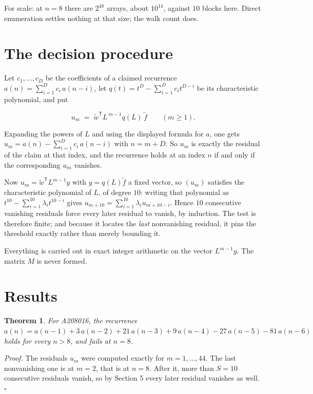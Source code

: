 \documentclass[11pt]{article}
\newtheorem{theorem}{Theorem}
\theoremstyle{definition}
\begin{document}
For scale: at $n = 8$ there are $2^{48}$ arrays, about $10^{14}$, against $10$ blocks here. Direct enumeration settles nothing at that size; the walk count does.

\section{The decision procedure}

Let $c_1,\dots,c_D$ be the coefficients of a claimed recurrence $a(n) = \sum_{i=1}^{D} c_i\,a(n-i)$, let $q(t) = t^{D} - \sum_{i=1}^{D} c_i t^{D-i}$ be its characteristic polynomial, and put

\[u_m \;=\; \tilde w^{\mathsf T} L^{\,m-1} q(L)\,\tilde f \qquad (m \ge 1).\]

Expanding the powers of $L$ and using the displayed formula for $a$, one gets $u_m = a(n) - \sum_{i=1}^{D} c_i\,a(n-i)$ with $n = m + D$. So $u_m$ is exactly the residual of the claim at that index, and the recurrence holds at an index $n$ if and only if the corresponding $u_m$ vanishes.

Now $u_m = \tilde w^{\mathsf T} L^{m-1} y$ with $y = q(L)\tilde f$ a fixed vector, so $(u_m)$ satisfies the characteristic polynomial of $L$, of degree $10$: writing that polynomial as $t^{10} - \sum_{i=1}^{10} \lambda_i t^{10-i}$ gives $u_{m+10} = \sum_{i=1}^{10} \lambda_i u_{m+10-i}$. Hence $10$ consecutive vanishing residuals force every later residual to vanish, by induction. The test is therefore finite; and because it locates the {\itshape last} nonvanishing residual, it pins the threshold exactly rather than merely bounding it.

Everything is carried out in exact integer arithmetic on the vector $L^{m-1}y$. The matrix $M$ is never formed.

\section{Results}

\begin{theorem} For A208016, the recurrence $a(n) = a(n-1) + 3\,a(n-2) + 21\,a(n-3) + 9\,a(n-4) - 27\,a(n-5) - 81\,a(n-6)$ holds for every $n > 8$, and fails at $n = 8$.\end{theorem}

{\itshape Proof.} The residuals $u_m$ were computed exactly for $m = 1,\dots,44$. The last nonvanishing one is at $m = 2$, that is at $n = 8$. After it, more than $S = 10$ consecutive residuals vanish, so by Section 5 every later residual vanishes as well. $\square$
\end{document}
